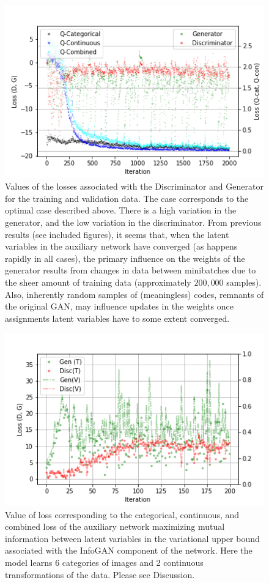 \documentclass{article}
\begin{document}
\begin{figure}[h]
\centering
  \includegraphics[width=\textwidth,scale=0.2]{figures/PlotGDQQData2Axes.png}
  \caption{Values of the losses associated with the Discriminator and Generator for the training and validation data.  The case corresponds to the optimal case described above.  There is a high variation in the generator, and the low variation in the discriminator.  From previous results (see included figures), it seems that, when the latent variables in the auxiliary network have converged (as happens rapidly in all cases), the primary influence on the weights of the generator results from changes in data between minibatches due to the sheer amount of training data (approximately $200,000$ samples).  Also, inherently random samples of (meaningless) codes, remnants of the original GAN, may influence updates in the weights once assignments latent variables have to some extent converged.}
\end{figure}\label{}


\begin{figure}[h]
\centering
  \includegraphics[width=\textwidth,scale=0.2]{figures/PlotGDData2Axes_Train_Validation_GD.png}
  \caption{Value of loss corresponding to the categorical, continuous, and combined loss of the auxiliary network maximizing mutual information between latent variables in the variational upper bound associated with the InfoGAN component of the network.  Here the model learns 6 categories of images and 2 continuous transformations of the data. Please see Discussion.}
\end{figure}\label{cat6gd}
\end{document}
